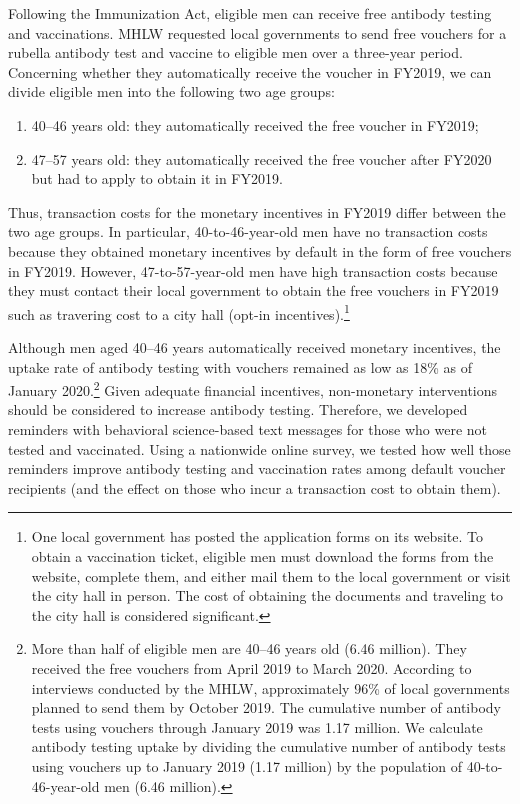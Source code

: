 \documentclass[
]{article}
\providecommand{\tightlist}{%
  \setlength{\itemsep}{0pt}\setlength{\parskip}{0pt}}
\begin{document}
Following the Immunization Act, eligible men can receive free antibody testing and vaccinations. MHLW requested local governments to send free vouchers for a rubella antibody test and vaccine to eligible men over a three-year period. Concerning whether they automatically receive the voucher in FY2019, we can divide eligible men into the following two age groups:

\begin{enumerate}
\def\labelenumi{\arabic{enumi}.}
\tightlist
\item
  40--46 years old: they automatically received the free voucher in FY2019;
\item
  47--57 years old: they automatically received the free voucher after FY2020 but had to apply to obtain it in FY2019.
\end{enumerate}

Thus, transaction costs for the monetary incentives in FY2019 differ between the two age groups. In particular, 40-to-46-year-old men have no transaction costs because they obtained monetary incentives by default in the form of free vouchers in FY2019. However, 47-to-57-year-old men have high transaction costs because they must contact their local government to obtain the free vouchers in FY2019 such as travering cost to a city hall (opt-in incentives).\footnote{One local government has posted the application forms on its website. To obtain a vaccination ticket, eligible men must download the forms from the website, complete them, and either mail them to the local government or visit the city hall in person. The cost of obtaining the documents and traveling to the city hall is considered significant.}

Although men aged 40--46 years automatically received monetary incentives, the uptake rate of antibody testing with vouchers remained as low as 18\% as of January 2020.\footnote{More than half of eligible men are 40--46 years old (6.46 million). They received the free vouchers from April 2019 to March 2020. According to interviews conducted by the MHLW, approximately 96\% of local governments planned to send them by October 2019. The cumulative number of antibody tests using vouchers through January 2019 was 1.17 million. We calculate antibody testing uptake by dividing the cumulative number of antibody tests using vouchers up to January 2019 (1.17 million) by the population of 40-to-46-year-old men (6.46 million).} Given adequate financial incentives, non-monetary interventions should be considered to increase antibody testing. Therefore, we developed reminders with behavioral science-based text messages for those who were not tested and vaccinated. Using a nationwide online survey, we tested how well those reminders improve antibody testing and vaccination rates among default voucher recipients (and the effect on those who incur a transaction cost to obtain them).
\end{document}
